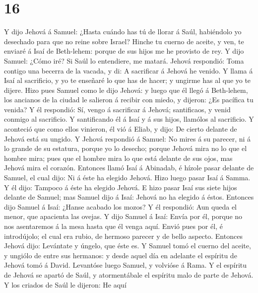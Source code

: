 \hypertarget{section-15}{%
\section{16}\label{section-15}}

 Y dijo Jehová á Samuel: ¿Hasta cuándo has tú de llorar á
Saúl, habiéndolo yo desechado para que no reine sobre Israel? Hinche tu
cuerno de aceite, y ven, te enviaré á Isaí de Beth-lehem: porque de sus
hijos me he provisto de rey.  Y dijo Samuel: ¿Cómo iré? Si
Saúl lo entendiere, me matará. Jehová respondió: Toma contigo una
becerra de la vacada, y di: A sacrificar á Jehová he venido.
 Y llama á Isaí al sacrificio, y yo te enseñaré lo que has
de hacer; y ungirme has al que yo te dijere.  Hizo pues
Samuel como le dijo Jehová: y luego que él llegó á Beth-lehem, los
ancianos de la ciudad le salieron á recibir con miedo, y dijeron: ¿Es
pacífica tu venida?  Y él respondió: Sí, vengo á
sacrificar á Jehová; santificaos, y venid conmigo al sacrificio. Y
santificando él á Isaí y á sus hijos, llamólos al sacrificio.
 Y aconteció que como ellos vinieron, él vió á Eliab, y
dijo: De cierto delante de Jehová está su ungido.  Y
Jehová respondió á Samuel: No mires á su parecer, ni á lo grande de su
estatura, porque yo lo desecho; porque Jehová mira no lo que el hombre
mira; pues que el hombre mira lo que está delante de sus ojos, mas
Jehová mira el corazón.  Entonces llamó Isaí á Abinadab, é
hízole pasar delante de Samuel, el cual dijo: Ni á éste ha elegido
Jehová.  Hizo luego pasar Isaí á Samma. Y él dijo: Tampoco
á éste ha elegido Jehová.  E hizo pasar Isaí sus siete
hijos delante de Samuel; mas Samuel dijo á Isaí: Jehová no ha elegido á
éstos.  Entonces dijo Samuel á Isaí: ¿Hanse acabado los
mozos? Y él respondió: Aun queda el menor, que apacienta las ovejas. Y
dijo Samuel á Isaí: Envía por él, porque no nos asentaremos á la mesa
hasta que él venga aquí.  Envió pues por él, é
introdújolo; el cual era rubio, de hermoso parecer y de bello aspecto.
Entonces Jehová dijo: Levántate y úngelo, que éste es.  Y
Samuel tomó el cuerno del aceite, y ungiólo de entre sus hermanos: y
desde aquel día en adelante el espíritu de Jehová tomó á David.
Levantóse luego Samuel, y volvióse á Rama.  Y el espíritu
de Jehová se apartó de Saúl, y atormentábale el espíritu malo de parte
de Jehová.  Y los criados de Saúl le dijeron: He aquí
